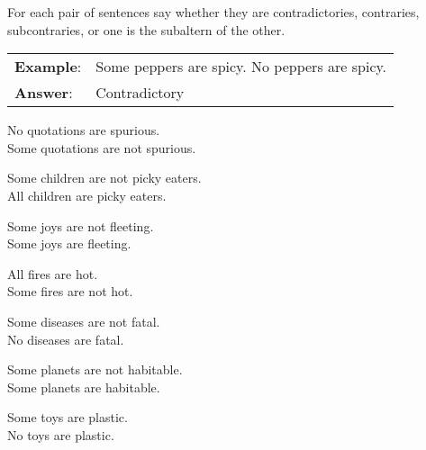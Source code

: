 
\practiceproblems
\noindent \problempart For each pair of sentences say whether they are contradictories, contraries, subcontraries, or one is the subaltern of the other.

\begin{longtabu}{p{.1\linewidth}p{.9\linewidth}}
\textbf{Example}: & Some peppers are spicy. \newline No peppers are spicy. \\
\textbf{Answer}: &Contradictory\\
\end{longtabu}

\begin{exercises}

\item No quotations are spurious.  \\
	Some quotations are not spurious.  

\item Some children are not picky eaters.  \\
	All children are picky eaters. \answer{\\Contradictories}

\item Some joys are not fleeting.  \\
	Some joys are fleeting.  \answer{\\Subcontraries}

\item All fires are hot.  \\
	Some fires are not hot.  \answer{\\Contradictories}

\item Some diseases are not fatal.  \\
	No diseases are fatal.  

\item Some planets are not habitable.  \\
	Some planets are habitable. \answer{\\Subcontraries}

\item Some toys are plastic.  \\
	No toys are plastic.   \answer{\\Contradictories}


\end{exercises}
